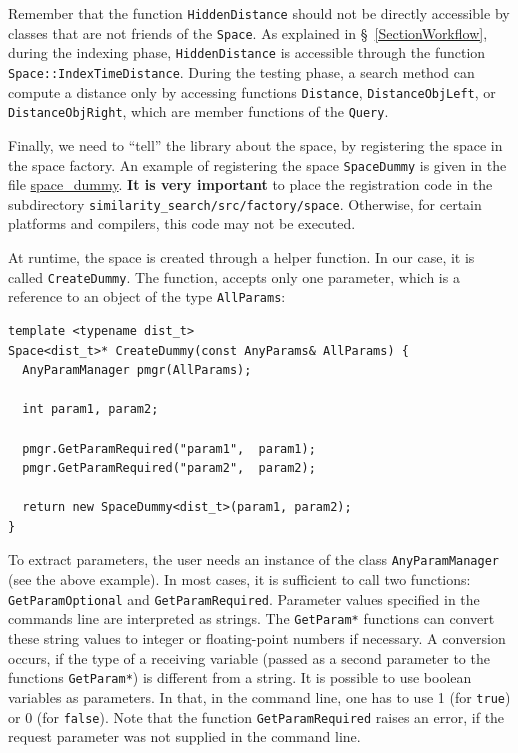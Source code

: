\documentclass[runningheads,a4paper]{llncs}
\newcommand{\ttt}[1]{\texttt{#1}}
\begin{document}
{Remember that the function \ttt{HiddenDistance} should not be directly accessible 
by classes that are not friends of the \ttt{Space}.
As explained in \S~\ref{SectionWorkflow},
during the indexing phase, 
\ttt{HiddenDistance} is accessible through the function
\ttt{Space::IndexTimeDistance}.
During the testing phase, a search method can compute a distance
only by accessing functions \ttt{Distance}, \ttt{DistanceObjLeft}, or
\ttt{DistanceObjRight}, which are member functions of the \ttt{Query}.

Finally, we need to ``tell'' the library about the space,
by registering the space in the space factory.
An example of registering the space \ttt{SpaceDummy}
is given in the file \href{https://github.com/searchivarius/NonMetricSpaceLib/blob/master/similarity_search/src/factory/space/space_dummy.cc}{space\_dummy}.
\textbf{It is very important} to place the registration code in the subdirectory 
\ttt{similarity\_search/src/factory/space}. 
Otherwise, for certain platforms and compilers, this code may not be executed.
\newpage

At runtime, the space is created through a helper function.
In our case, it is called \ttt{CreateDummy}.
The function, accepts only one parameter,
which is a reference to an object of the type \ttt{AllParams}:

\begin{verbatim}
template <typename dist_t>
Space<dist_t>* CreateDummy(const AnyParams& AllParams) {
  AnyParamManager pmgr(AllParams);

  int param1, param2;

  pmgr.GetParamRequired("param1",  param1);
  pmgr.GetParamRequired("param2",  param2);

  return new SpaceDummy<dist_t>(param1, param2);
}
\end{verbatim}
To extract parameters, the user needs an instance of the class \ttt{AnyParamManager} (see the above example).
In most cases, it is sufficient to call two functions: \ttt{GetParamOptional} and
\ttt{GetParamRequired}.
Parameter values specified in the commands line are interpreted as strings.
The \ttt{GetParam*} functions can convert these string values
to integer or floating-point numbers if necessary.
A conversion occurs, if the type of a receiving variable (passed as a second parameter
to the functions \ttt{GetParam*}) is different from a string.
It is possible to use boolean variables as parameters.
In that, in the command line, one has to use 1 (for \ttt{true}) or 0 (for \ttt{false}).
Note that the function \ttt{GetParamRequired} raises an error, 
if the request parameter was not supplied in the command line.

}
\end{document}
